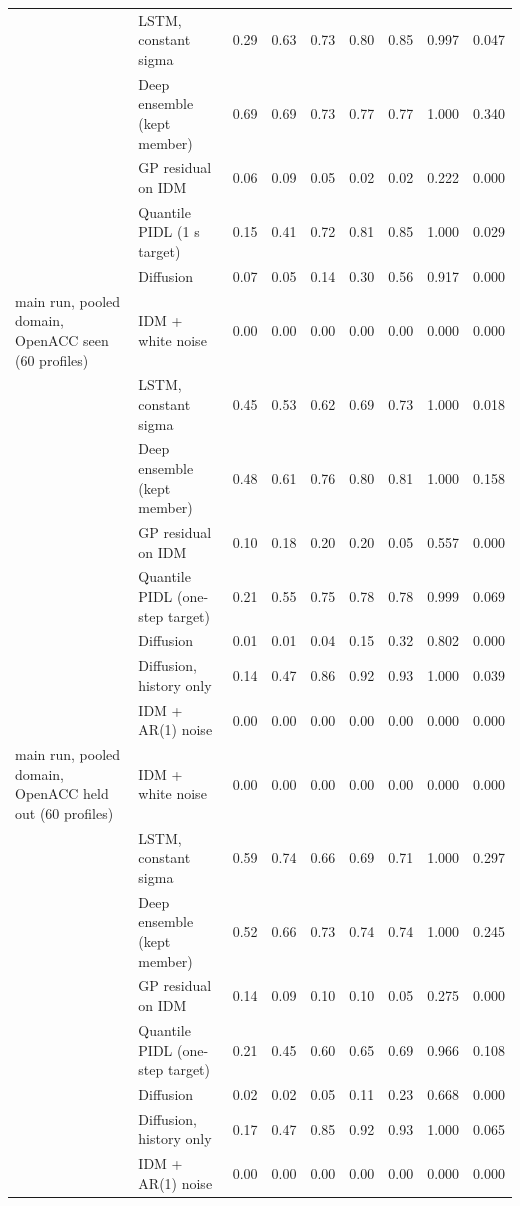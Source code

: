 \begin{longtable}{llrrrrrrr}
 & LSTM, constant sigma & 0.29 & 0.63 & 0.73 & 0.80 & 0.85 & 0.997 & 0.047 \\
 & Deep ensemble (kept member) & 0.69 & 0.69 & 0.73 & 0.77 & 0.77 & 1.000 & 0.340 \\
 & GP residual on IDM & 0.06 & 0.09 & 0.05 & 0.02 & 0.02 & 0.222 & 0.000 \\
 & Quantile PIDL (1 s target) & 0.15 & 0.41 & 0.72 & 0.81 & 0.85 & 1.000 & 0.029 \\
 & Diffusion & 0.07 & 0.05 & 0.14 & 0.30 & 0.56 & 0.917 & 0.000 \\
\midrule
main run, pooled domain, OpenACC seen (60 profiles) & IDM + white noise & 0.00 & 0.00 & 0.00 & 0.00 & 0.00 & 0.000 & 0.000 \\
 & LSTM, constant sigma & 0.45 & 0.53 & 0.62 & 0.69 & 0.73 & 1.000 & 0.018 \\
 & Deep ensemble (kept member) & 0.48 & 0.61 & 0.76 & 0.80 & 0.81 & 1.000 & 0.158 \\
 & GP residual on IDM & 0.10 & 0.18 & 0.20 & 0.20 & 0.05 & 0.557 & 0.000 \\
 & Quantile PIDL (one-step target) & 0.21 & 0.55 & 0.75 & 0.78 & 0.78 & 0.999 & 0.069 \\
 & Diffusion & 0.01 & 0.01 & 0.04 & 0.15 & 0.32 & 0.802 & 0.000 \\
 & Diffusion, history only & 0.14 & 0.47 & 0.86 & 0.92 & 0.93 & 1.000 & 0.039 \\
 & IDM + AR(1) noise & 0.00 & 0.00 & 0.00 & 0.00 & 0.00 & 0.000 & 0.000 \\
\midrule
main run, pooled domain, OpenACC held out (60 profiles) & IDM + white noise & 0.00 & 0.00 & 0.00 & 0.00 & 0.00 & 0.000 & 0.000 \\
 & LSTM, constant sigma & 0.59 & 0.74 & 0.66 & 0.69 & 0.71 & 1.000 & 0.297 \\
 & Deep ensemble (kept member) & 0.52 & 0.66 & 0.73 & 0.74 & 0.74 & 1.000 & 0.245 \\
 & GP residual on IDM & 0.14 & 0.09 & 0.10 & 0.10 & 0.05 & 0.275 & 0.000 \\
 & Quantile PIDL (one-step target) & 0.21 & 0.45 & 0.60 & 0.65 & 0.69 & 0.966 & 0.108 \\
 & Diffusion & 0.02 & 0.02 & 0.05 & 0.11 & 0.23 & 0.668 & 0.000 \\
 & Diffusion, history only & 0.17 & 0.47 & 0.85 & 0.92 & 0.93 & 1.000 & 0.065 \\
 & IDM + AR(1) noise & 0.00 & 0.00 & 0.00 & 0.00 & 0.00 & 0.000 & 0.000 \\

\end{longtable}

